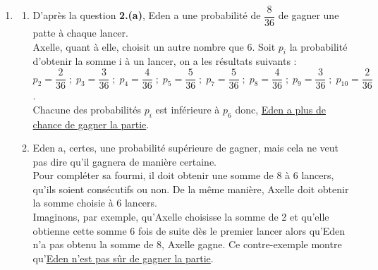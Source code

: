 \begin{activite}
{\begin{enumerate}
\begin{enumerate}
                  D'après le tableau, on a 8 issues possibles. \\
                  \uline{La probabilité que l'élève gagne une patte au premier lancer est de} $\uline{\dfrac{8}{36} =\dfrac{2}{9}}$. \smallskip
               \item L'élève peut placer deux pattes en deux lancers s'il obtient une somme de 6 au premier lancer (probabilité égale à $\dfrac29$), et une somme de 6 au deuxième lancer (probabilité égale à $\dfrac29$) d'après la question précédente. \\
            On a alors $p =\dfrac29\times\dfrac29 =\dfrac{4}{81}$. \\
            \uline{La probabilité que l'élève gagne deux pattes en deux lancers est de} $\uline{\dfrac{4}{81}}$. \smallskip
         \end{enumerate}
      \item 
         \begin{enumerate}
            \item D'après la question {\bf 2.(a)}, Eden a une probabilité de $\dfrac8{36}$ de gagner une patte à chaque lancer. \\ [1mm]
               Axelle, quant à elle, choisit un autre nombre que 6. Soit $p_i$ la probabilité d'obtenir la somme \og i \fg{} à un lancer, on a les résultats suivants : \\ [1mm]
               $p_2 =\dfrac2{36} \; ; \; p_3 =\dfrac3{36} \; ; \; p_4 =\dfrac4{36} \; ; \; p_5 =\dfrac5{36} \; ; \; p_7 =\dfrac5{36} \; ; \; p_8 =\dfrac4{36} \; ; \; p_9 =\dfrac3{36} \; ; \; p_{10} =\dfrac2{36}$. \\ [1mm]
               Chacune des probabilités $p_i$ est inférieure à $p_6$ donc,
               \uline{Eden a plus de chance de gagner la partie}.       
            \item Eden a, certes, une probabilité supérieure de gagner, mais cela ne veut pas dire qu'il gagnera de manière certaine. \\
               Pour compléter sa fourmi, il doit obtenir une somme de 8 à 6 lancers, qu'ils soient consécutifs ou non. De la même manière, Axelle doit obtenir la somme choisie à 6 lancers. \\
               Imaginons, par exemple, qu'Axelle choisisse la somme de 2 et qu'elle obtienne cette somme 6 fois de suite dès le premier lancer alors qu'Eden n'a pas obtenu la somme de 8, Axelle gagne. Ce contre-exemple montre qu'\uline{Eden n'est pas sûr de gagner la partie}.
         \end{enumerate}
      \end{enumerate}}
\end{activite}


